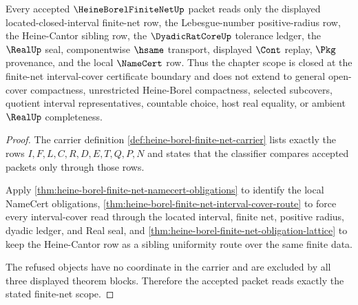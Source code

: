 \begin{theorem}
\label{thm:heine-borel-finite-net-scope-witness}
Every accepted $\HeineBorelFiniteNetUp$ packet reads only the displayed located-closed-interval finite-net row, the Lebesgue-number positive-radius row, the Heine-Cantor sibling row, the $\DyadicRatCoreUp$ tolerance ledger, the $\RealUp$ seal, componentwise $\hsame$ transport, displayed $\Cont$ replay, $\Pkg$ provenance, and the local $\NameCert$ row. Thus the chapter scope is closed at the finite-net interval-cover certificate boundary and does not extend to general open-cover compactness, unrestricted Heine-Borel compactness, selected subcovers, quotient interval representatives, countable choice, host real equality, or ambient $\RealUp$ completeness.
\end{theorem}
\begin{proof}
The carrier definition \autoref{def:heine-borel-finite-net-carrier} lists exactly the rows $I,F,L,C,R,D,E,T,Q,P,N$ and states that the classifier compares accepted packets only through those rows.

Apply \autoref{thm:heine-borel-finite-net-namecert-obligations} to identify the local NameCert obligations, \autoref{thm:heine-borel-finite-net-interval-cover-route} to force every interval-cover read through the located interval, finite net, positive radius, dyadic ledger, and Real seal, and \autoref{thm:heine-borel-finite-net-obligation-lattice} to keep the Heine-Cantor row as a sibling uniformity route over the same finite data.

The refused objects have no coordinate in the carrier and are excluded by all three displayed theorem blocks. Therefore the accepted packet reads exactly the stated finite-net scope.
\end{proof}

